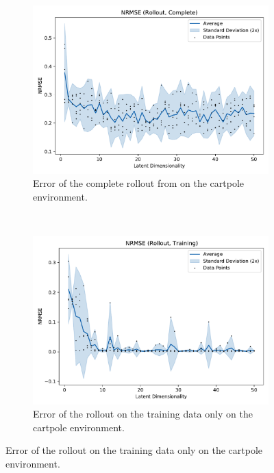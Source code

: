 			\begin{figure}
				\centering
				\begin{subfigure}{0.7\linewidth}
					\centering
					\includegraphics[width=\linewidth]{figures/results/cartpole-gym/latent-dim/comparison-rmse-rollout-normalized-mean-vs-latent-dim.pdf}
					\caption{Error of the complete rollout from on the cartpole environment.}
					\label{fig:cartpoleRmseComplete}
				\end{subfigure} \\
				\begin{subfigure}{0.5\linewidth}
					\centering
					\includegraphics[width=\linewidth]{figures/results/cartpole-gym/latent-dim/comparison-rmse-rollout-train-normalized-mean-vs-latent-dim.pdf}
					\caption{Error of the rollout on the training data only on the cartpole environment.}

\end{subfigure}
\end{figure}
